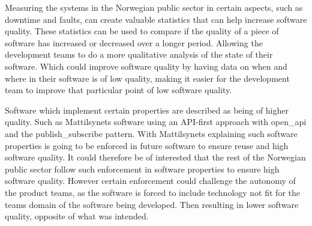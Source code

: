 Measuring the systems in the Norwegian public sector in certain aspects, such as downtime and faults, can create valuable statistics that can help increase software quality. These statistics can be used to compare if the quality of a piece of software has increased or decreased over a longer period. Allowing the development teams to do a more qualitative analysis of the state of their software. Which could improve software quality by having data on when and where in their software is of low quality, making it easier for the development team to improve that particular point of low software quality.

Software which implement certain properties are described as being of higher quality. Such as Mattilsynets software using an API-first approach with \gls{open_api} and the \gls{publish_subscribe} pattern. With Mattilsynets explaining such software properties is going to be enforced in future software to ensure reuse and high software quality. It could therefore be of interested that the rest of the Norwegian public sector follow such enforcement in software properties to ensure high software quality. However certain enforcement could challenge the autonomy of the product teams, as the software is forced to include technology not fit for the teams domain of the software being developed. Then resulting in lower software quality, opposite of what was intended.




